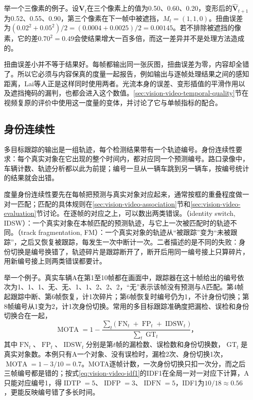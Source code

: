 举一个三像素的例子。设$\bm V_t$在三个像素上的值为0.50、0.60、0.20，变形后的$\widehat{\bm V}_{t+1}$为0.52、0.55、0.90，第三个像素在下一帧中被遮挡，$M_t=(1,1,0)$。扭曲误差为$(0.02^2+0.05^2)/2=(0.0004+0.0025)/2=0.00145$。若不排除被遮挡的像素，它的差$0.70^2=0.49$会使结果增大一百多倍，而这一差异并不是处理方法造成的。

扭曲误差小并不等于结果好。每帧都输出同一张灰图，扭曲误差为零，内容却全错了。所以它必须与内容保真的度量一起报告，例如输出与逐帧处理结果之间的感知距离，Lai等人正是这样同时使用两者。光流本身的误差、变形插值的平滑作用以及遮挡掩码的漏判，也都会进入这个数值。\ref{sec:vision-video-temporal-quality}节在视频复原的评价中使用这一度量的变体，并讨论了它与单帧指标的配合。

\subsection{身份连续性}
\label{sec:vision-videofound-identity}

多目标跟踪的输出是一组轨迹，每个检测结果带有一个轨迹编号。身份连续性要求：每个真实对象在它出现的整个时间内，都对应同一个预测编号。路口录像中，车辆计数、轨迹分析都以此为前提；编号一旦从一辆车跳到另一辆车，按编号统计的结果就会出错。

度量身份连续性要先在每帧把预测与真实对象对应起来，通常按框的重叠程度做一对一匹配；匹配的具体规则在\ref{sec:vision-video-association}节和\ref{sec:vision-video-evaluation}节讨论。在逐帧的对应之上，可以数出两类错误。（identity switch, IDSW）：一个真实对象在本帧匹配的预测轨迹，与它上一次被匹配时的轨迹不同。（track fragmentation, FM）：一个真实对象的轨迹从“被跟踪”变为“未被跟踪”，之后又恢复被跟踪，每发生一次中断计一次。二者描述的是不同的失败：身份切换是编号换错了，轨迹碎片是跟踪断开了，断开后用同一编号接上只算碎片，用新编号接上则两类错误都要计。

举一个例子。真实车辆A在第1至10帧都在画面中，跟踪器在这十帧给出的编号依次为1、1、1、无、无、1、1、2、2、2，“无”表示该帧没有预测与A匹配。第4帧起跟踪中断、第6帧恢复，计1次碎片；第6帧恢复时编号仍为1，不计身份切换；第8帧编号从1变为2，计1次身份切换。常用的多目标跟踪准确度把漏检、误检和身份切换合在一起，
\[
  \operatorname{MOTA}=1-\frac{\sum_t\bigl(\operatorname{FN}_t+\operatorname{FP}_t+\operatorname{IDSW}_t\bigr)}{\sum_t\operatorname{GT}_t}\text{，}
\]
其中$\operatorname{FN}_t$、$\operatorname{FP}_t$、$\operatorname{IDSW}_t$分别是第$t$帧的漏检数、误检数和身份切换数，$\operatorname{GT}_t$是真实对象数。本例只有A一个对象、没有误检时，漏检2次、身份切换1次，$\operatorname{MOTA}=1-3/10=0.7$。MOTA逐帧计数，一次身份切换只扣一次分，而之后三帧编号都是错的；按式\eqref{eq:vision-video-idf1}的IDF1在全局一对一对应下计算，A只能对应编号1，得$\operatorname{IDTP}=5$、$\operatorname{IDFP}=3$、$\operatorname{IDFN}=5$，IDF1为$10/18\approx0.56$，更能反映编号错了多长时间。

